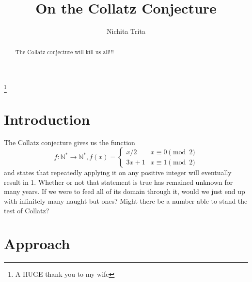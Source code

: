\documentclass{proc-l}
\theoremstyle{definition}
\theoremstyle{remark}
\numberwithin{equation}{section}
\begin{document}
\title{On the Collatz Conjecture}


\author{Nichita Trita}
\address{Metalurgiei 132, Bloc A, ap. 54, Bucharest, Romania}
\thanks{A HUGE thank you to my wife}






\begin{abstract}
The Collatz conjecture will kill us all!!!
\end{abstract}

\maketitle


\section{Introduction}

The Collatz conjecture gives us the function 
\[f : \mathbb{N}^{*} \rightarrow \mathbb{N}^{*}, f(x) = 
\begin{cases}
	x / 2 & x\equiv 0 \pmod 2\\
	3x + 1 & x\equiv 1 \pmod 2
\end{cases}\] and states that repeatedly applying it on any positive integer will eventually result in 1. Whether or not that statement is true has remained unknown for many years. If we were to feed all of its domain through it, would we just end up with infinitely many naught but ones? Might there be a number able to stand the test of Collatz?

\section{Approach}
\end{document}
